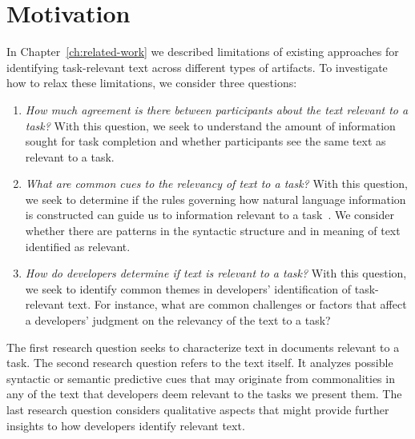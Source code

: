 \section{Motivation}
\label{cp3:method}



In Chapter~\ref{ch:related-work} we described limitations 
of existing approaches for identifying task-relevant 
text across different types of artifacts. 
To investigate how to relax these limitations, we consider three questions:


\begin{enumerate}[label=\textit{RQ\arabic*},leftmargin=*]

    \item \textit{How much agreement is there between participants about the text
    relevant to a task?} With this question, we seek to understand
    the amount of information sought for task completion
    and whether participants see the same text as
    relevant to a task.

    \item \textit{What are common cues to the relevancy of text to a task?}
    With this question, we seek to determine if the rules governing how natural language information
    is constructed can guide us to information relevant to a task~\cite{Kintsch1978a}.
    We consider whether there
    are patterns in the  syntactic structure and in meaning of text identified as relevant.

    \item \textit{How do developers determine if text is relevant to a task?}
    With this question, we seek to identify common themes in developers' identification of task-relevant text. For instance, what are common challenges or factors that affect a developers' judgment on the relevancy of the text to a task?

\end{enumerate}



The first research question seeks to characterize text
in documents relevant to a task.
The second research question refers to the text itself.
It analyzes possible syntactic or semantic
predictive cues that may originate from commonalities in any of the text that developers deem relevant to the tasks we present them.
The last research question considers qualitative aspects that might provide
further insights to how developers identify relevant text.

